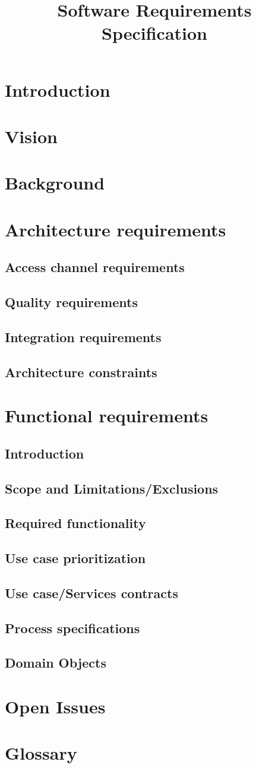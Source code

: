 \documentclass[12pt]{article}
\title{Software Requirements Specification}
\date{}
\begin{document}
  \maketitle  
  \tableofcontents
  \section{Introduction}
  \section{Vision}
  \section{Background}
  \section{Architecture requirements}
  \subsection{Access channel requirements}
  \subsection{Quality requirements}
  \subsection{Integration requirements}
  \subsection{Architecture constraints}
  \section{Functional requirements}
  \subsection{Introduction}
  \subsection{Scope and Limitations/Exclusions}
  \subsection{Required functionality}
 \subsection{Use case prioritization}
 \subsection{Use case/Services contracts}
 \subsection{Process specifications}
 \subsection{Domain Objects}
 \section{Open Issues}
 \section{Glossary}
  
\end{document}

